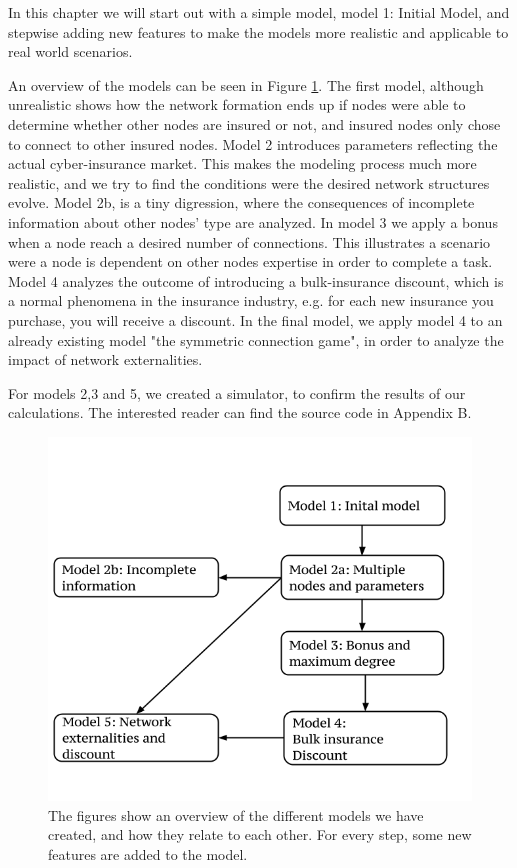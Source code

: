 In this chapter we will start out with a simple model, model 1: Initial Model, and stepwise adding new features to make the models more realistic and applicable to real world scenarios.

An overview of the models can be seen in Figure \ref{fig:Overview-of-models}. The first model, although unrealistic shows how the network formation ends up if nodes were able to determine whether other nodes are insured or not, and insured nodes only chose to connect to other insured nodes. 
Model 2 introduces parameters reflecting the actual cyber-insurance market. This makes the modeling process much more realistic, and we try to find the conditions were the desired network structures evolve. Model 2b, is a tiny digression, where the consequences of incomplete information about other nodes' type are analyzed. 
In model 3 we apply a bonus when a node reach a desired number of connections. This illustrates a scenario were a node is dependent on other nodes expertise in order to complete a task.
Model 4 analyzes the outcome of introducing a bulk-insurance discount, which is a normal phenomena in the insurance industry, e.g. for each new insurance you purchase, you will receive a discount. 
In the final model, we apply model 4 to an already existing model "the symmetric connection game", in order to analyze the impact of network externalities.

 For models 2,3 and 5, we created a simulator, to confirm the results of our calculations. The interested reader can find the source code in Appendix B.
\begin{figure}[h]
\centering
  \includegraphics[width=0.9\linewidth]{../Figures/modeloverview.png}
  \caption{\label{fig:Overview-of-models} The figures show an overview of the different models we have created, and how they relate to each other. For every step, some new features are added to the model.}

\end{figure}

